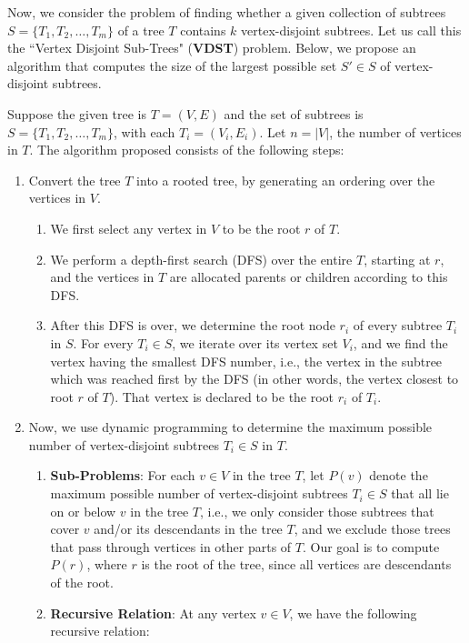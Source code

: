 \documentclass[11pt, fleqn]{article}
\begin{document}
\begin{itemize}
    \bigskip
    
    Now, we consider the problem of finding whether a given collection of subtrees $S=\{T_1,T_2,\dots,T_m\}$ of a tree $T$ contains $k$ vertex-disjoint subtrees. Let us call this the ``Vertex Disjoint Sub-Trees" (\textbf{VDST}) problem. Below, we propose an algorithm that computes the size of the largest possible set $S'\in S$ of vertex-disjoint subtrees.
    
    Suppose the given tree is $T=(V,E)$ and the set of subtrees is $S=\{T_1,T_2,\dots,T_m\}$, with each $T_i=(V_i,E_i)$. Let $n=|V|$, the number of vertices in $T$. The algorithm proposed consists of the following steps:
    \begin{enumerate}
        \item Convert the tree $T$ into a rooted tree, by generating an ordering over the vertices in $V$.
        \begin{enumerate}
            \item We first select any vertex in $V$ to be the root $r$ of $T$.
            \item We perform a depth-first search (DFS) over the entire $T$, starting at $r$, and the vertices in $T$ are allocated parents or children according to this DFS.
            \item After this DFS is over, we determine the root node $r_i$ of every subtree $T_i$ in $S$. For every $T_i\in S$, we iterate over its vertex set $V_i$, and we find the vertex having the smallest DFS number, i.e., the vertex in the subtree which was reached first by the DFS (in other words, the vertex closest to root $r$ of $T$). That vertex is declared to be the root $r_i$ of $T_i$.
        \end{enumerate}
        \item Now, we use dynamic programming to determine the maximum possible number of vertex-disjoint subtrees $T_i\in S$ in $T$.
        \begin{enumerate}
            \item \textbf{Sub-Problems}: For each $v\in V$ in the tree $T$, let $P(v)$ denote the maximum possible number of vertex-disjoint subtrees $T_i\in S$ that all lie on or below $v$ in the tree $T$, i.e., we only consider those subtrees that cover $v$ and/or its descendants in the tree $T$, and we exclude those trees that pass through vertices in other parts of $T$. Our goal is to compute $P(r)$, where $r$ is the root of the tree, since all vertices are descendants of the root.
            \item \textbf{Recursive Relation}: At any vertex $v\in V$, we have the following recursive relation:

\end{enumerate}
\end{enumerate}
\end{itemize}
\end{document}
